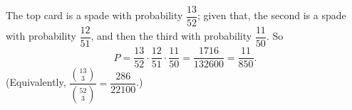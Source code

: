 The top card is a spade with probability $\dfrac{13}{52}$; given that, the second is a spade with probability $\dfrac{12}{51}$, and then the third with probability $\dfrac{11}{50}$. So
\[
P=\dfrac{13}{52}\cdot\dfrac{12}{51}\cdot\dfrac{11}{50}=\dfrac{1716}{132600}=\boxed{\dfrac{11}{850}}.
\]
(Equivalently, $\dfrac{\binom{13}{3}}{\binom{52}{3}}=\dfrac{286}{22100}$.)
